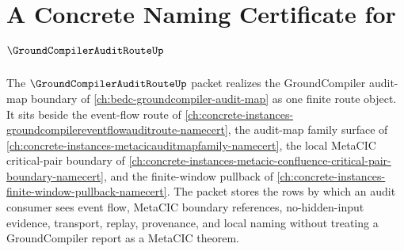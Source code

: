 \chapter{A Concrete Naming Certificate for $\GroundCompilerAuditRouteUp$}
\label{ch:concrete-instances-groundcompiler-audit-route-namecert}

The $\GroundCompilerAuditRouteUp$ packet realizes the GroundCompiler audit-map boundary of \autoref{ch:bedc-groundcompiler-audit-map} as one finite route object. It sits beside the event-flow route of \autoref{ch:concrete-instances-groundcompilereventflowauditroute-namecert}, the audit-map family surface of \autoref{ch:concrete-instances-metacicauditmapfamily-namecert}, the local MetaCIC critical-pair boundary of \autoref{ch:concrete-instances-metacic-confluence-critical-pair-boundary-namecert}, and the finite-window pullback of \autoref{ch:concrete-instances-finite-window-pullback-namecert}. The packet stores the rows by which an audit consumer sees event flow, MetaCIC boundary references, no-hidden-input evidence, transport, replay, provenance, and local naming without treating a GroundCompiler report as a MetaCIC theorem.



